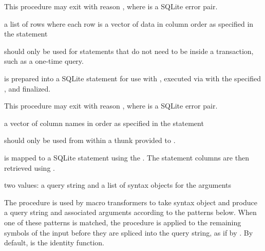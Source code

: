 This procedure may exit with reason , where  is a SQLite error pair.

\begin{procedure}
\end{procedure}
\returns{}
a list of rows where each row is a vector of data in column order as
specified in the  statement

 should only be used for statements that do not need to be inside a transaction, such as a one-time query.

 is prepared into a SQLite statement for use with , executed via  with the specified , and finalized.

This procedure may exit with reason , where  is a SQLite error pair.

\begin{procedure}
\end{procedure}
\returns{}
a vector of column names in order as specified in the  statement

 should only be used from within a thunk 
provided to .

 is mapped to a SQLite statement using the
. The statement columns are then retrieved
using .

\begin{procedure}\end{procedure}
\returns{} two values: a query string and a list of syntax objects for
the arguments

The  procedure is used by macro transformers to take
syntax object  and produce a query string and associated
arguments according to the patterns below.
When one of these patterns is matched, the  procedure is
applied to the remaining symbols of the input before they are spliced into the
query string, as if by .
By default,  is the identity function.

